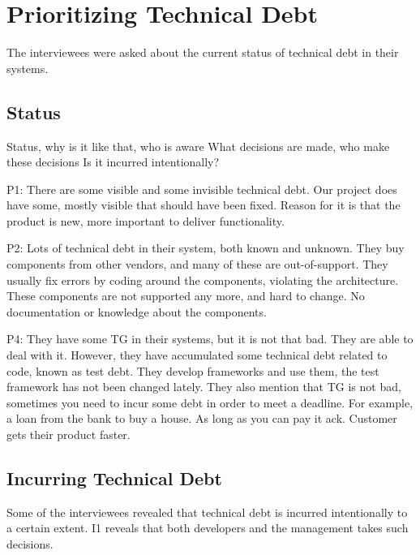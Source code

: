 \section{Prioritizing Technical Debt}
\label{sec:project}
The interviewees were asked about the current status of technical debt in their systems.


\subsection{Status}
Status, why is it like that, who is aware 
What decisions are made, who make these decisions
Is it incurred intentionally?

P1: There are some visible and some invisible technical debt. Our project does have some, mostly visible that should have been fixed. Reason for it is that the product is new, more important to deliver functionality. 

P2: Lots of technical debt in their system, both known and unknown. They buy components from other vendors, and many of these are out-of-support. They usually fix errors by coding around the components, violating the architecture. These components are not supported any more, and hard to change. No documentation or knowledge about the components.

P4: They have some TG in their systems, but it is not that bad. They are able to deal with it. However, they have accumulated some technical debt related to code, known as test debt. They develop frameworks and use them, the test framework has not been changed lately. They also mention that TG is not bad, sometimes you need to incur some debt in order to meet a deadline. For example, a loan from the bank to buy a house. As long as you can pay it ack. Customer gets their product faster. 


\subsection{Incurring Technical Debt}
Some of the interviewees revealed that technical debt is incurred intentionally to a certain extent. I1 reveals that both developers and the management takes such decisions. 

